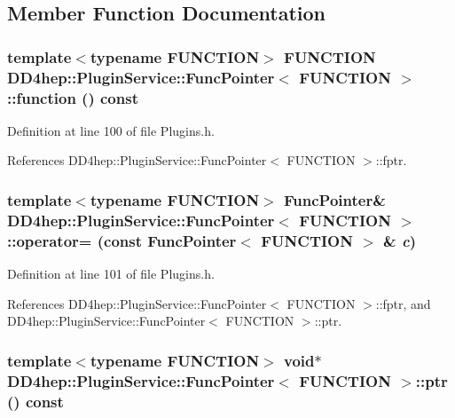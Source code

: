 \subsection{Member Function Documentation}
\hypertarget{struct_d_d4hep_1_1_plugin_service_1_1_func_pointer_a457cb34fac74ed0bfaa9f77905f936af}{
\subsubsection[{function}]{\setlength{\rightskip}{0pt plus 5cm}template$<$typename FUNCTION$>$ FUNCTION {\bf DD4hep::PluginService::FuncPointer}$<$ FUNCTION $>$::function () const}}
\label{struct_d_d4hep_1_1_plugin_service_1_1_func_pointer_a457cb34fac74ed0bfaa9f77905f936af}


Definition at line 100 of file Plugins.h.

References DD4hep::PluginService::FuncPointer$<$ FUNCTION $>$::fptr.\hypertarget{struct_d_d4hep_1_1_plugin_service_1_1_func_pointer_a90ba8c1510a405a5cf21da4625c9e76b}{
\subsubsection[{operator=}]{\setlength{\rightskip}{0pt plus 5cm}template$<$typename FUNCTION$>$ {\bf FuncPointer}\& {\bf DD4hep::PluginService::FuncPointer}$<$ FUNCTION $>$::operator= (const {\bf FuncPointer}$<$ FUNCTION $>$ \& {\em c})}}
\label{struct_d_d4hep_1_1_plugin_service_1_1_func_pointer_a90ba8c1510a405a5cf21da4625c9e76b}


Definition at line 101 of file Plugins.h.

References DD4hep::PluginService::FuncPointer$<$ FUNCTION $>$::fptr, and DD4hep::PluginService::FuncPointer$<$ FUNCTION $>$::ptr.\hypertarget{struct_d_d4hep_1_1_plugin_service_1_1_func_pointer_af926d56a3d2d1edb432a1ef92d0dee32}{
\subsubsection[{ptr}]{\setlength{\rightskip}{0pt plus 5cm}template$<$typename FUNCTION$>$ void$\ast$ {\bf DD4hep::PluginService::FuncPointer}$<$ FUNCTION $>$::{\bf ptr} () const}}
\label{struct_d_d4hep_1_1_plugin_service_1_1_func_pointer_af926d56a3d2d1edb432a1ef92d0dee32}


